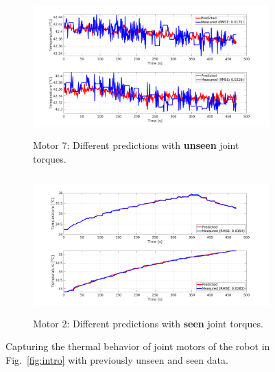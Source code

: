 \documentclass{ifacconf}
\begin{document}
\begin{figure}[t!]
	\begin{subfigure}[t]{0.5\textwidth}
		\centering
		\includegraphics[height=2.1in, width=\linewidth, keepaspectratio]{./pictures/applications/feedback/new/j7_legend_rmse_l_20.png}
		\caption{Motor 7: Different predictions with \textbf{unseen} joint torques.}
	\end{subfigure}%
	\begin{subfigure}[t]{0.5\textwidth}
		\centering
		\includegraphics[height=2.1in, width=\linewidth, keepaspectratio]{./pictures/applications/feedback/new/j2_seen_legend_rmse_l_20.png}
		\caption{Motor 2: Different predictions with \textbf{seen} joint torques.}
	\end{subfigure}

	\caption{Capturing the thermal behavior of joint motors of the robot in Fig.~\ref{fig:intro} with previously unseen and seen data.}
	\label{sevenjoint} 
\end{figure}
\end{document}
